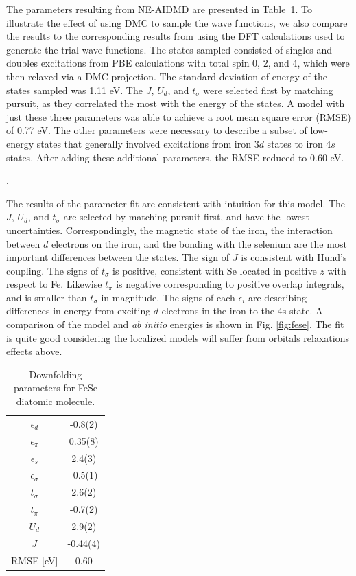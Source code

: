 The parameters resulting from NE-AIDMD are presented in Table~\ref{tab:fese}. 
To illustrate the effect of using DMC to sample the wave functions, we also compare the results to the corresponding results from using the DFT calculations used to generate the trial wave functions. 
The states sampled consisted of singles and doubles excitations from PBE calculations with total spin 0, 2, and 4, which were then relaxed via a DMC projection.
The standard deviation of energy of the states sampled was 1.11 eV.
The $J$, $U_d$, and $t_\sigma$ were selected first by matching pursuit, as they correlated the most with the energy of the states.
A model with just these three parameters was able to achieve a root mean square error (RMSE) of 0.77 eV.
The other parameters were necessary to describe a subset of low-energy states that generally involved excitations from iron $3d$ states to iron $4s$ states. 
After adding these additional parameters, the RMSE reduced to 0.60 eV.

.

The results of the parameter fit are consistent with intuition for this model. 
The $J$, $U_d$, and $t_\sigma$ are selected by matching pursuit first, and have the lowest uncertainties.
Correspondingly, the magnetic state of the iron, the interaction between $d$ electrons on the iron, and the bonding with the selenium are the most important differences between the states.
The sign of $J$ is consistent with Hund's coupling. 
The signs of $t_\sigma$ is positive, consistent with Se located in positive $z$ with respect to Fe. 
Likewise $t_\pi$ is negative corresponding to positive overlap integrals, and is smaller than $t_\sigma$ in magnitude.
The signs of each $\epsilon_i$ are describing differences in energy from exciting $d$ electrons in the iron to the 4s state.
A comparison of the model and \textit{ab initio} energies is shown in Fig. \ref{fig:fese}.
The fit is quite good considering the localized models will suffer from orbitals relaxations effects above. 

\begin{table}[ht]
\label{tab:fese}
\centering
\begin{tabular}{|c|c|}
\hline
  $\epsilon_d$       &  -0.8(2) \\
  $\epsilon_\pi$     &  0.35(8) \\
  $\epsilon_s$       &  2.4(3)  \\
  $\epsilon_\sigma$  &  -0.5(1) \\
  $t_\sigma$         &  2.6(2)  \\
  $t_\pi$            &  -0.7(2) \\
  $U_d$              &  2.9(2)  \\
  $J$                &  -0.44(4) \\
\hline
  RMSE [eV] & 0.60 \\
\hline
\end{tabular}
\caption{Downfolding parameters for FeSe diatomic molecule.}
\end{table} 

